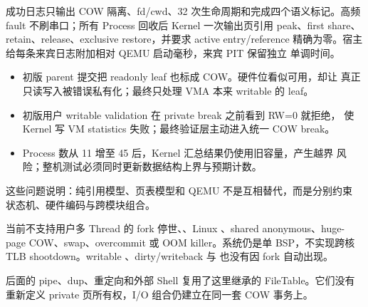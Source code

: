 成功日志只输出 COW 隔离、fd/cwd、32 次生命周期和完成四个语义标记。高频
fault 不刷串口；所有 Process 回收后 Kernel 一次输出页引用 peak、first
share、retain、release、exclusive restore，并要求 active entry/reference
精确为零。宿主给每条来宾日志附加相对 QEMU 启动毫秒，来宾 PIT 保留独立
单调时间。

\par
\begin{itemize}
  \item 初版 parent 提交把 readonly leaf 也标成 COW。硬件位看似可用，却让
        真正只读写入被错误私有化；最终只处理 VMA 本来 writable 的 leaf。
  \item 初版用户 writable validation 在 private break 之前看到 RW=0 就拒绝，
        使 Kernel 写 VM statistics 失败；最终验证层主动进入统一 COW break。
  \item Process 数从 11 增至 45 后，Kernel 汇总结果仍使用旧容量，产生越界
        风险；整机测试必须同时更新数据结构上界与预期计数。
\end{itemize}

这些问题说明：纯引用模型、页表模型和 QEMU 不是互相替代，而是分别约束
状态机、硬件编码与跨模块组合。

当前不支持用户多 Thread 的 fork 停世、、Linux
、shared anonymous、huge-page COW、swap、overcommit 或 OOM
killer。系统仍是单 BSP，不实现跨核 TLB shootdown。writable
、dirty/writeback 与  也没有因 fork 自动出现。

后面的 pipe、dup、重定向和外部 Shell 复用了这里继承的
FileTable。它们没有重新定义 private 页所有权，I/O 组合仍建立在同一套 COW
事务上。
